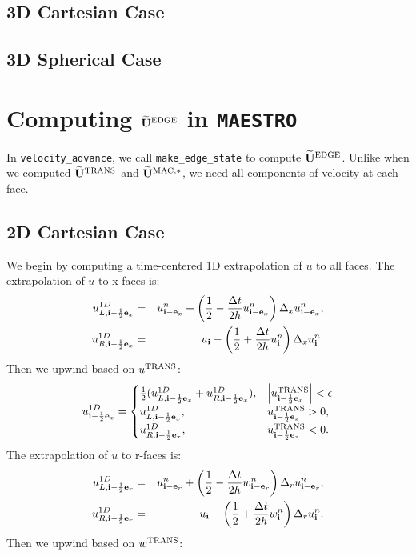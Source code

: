 \documentclass[11pt]{article}
\def\half  {\frac{1}{2}}
\def\dt    {\Delta t}
\def\edge  {\rm EDGE}
\def\mac   {\rm MAC}
\def\trans {\rm TRANS}
\def\eb    {{\bf e}}
\def\ib    {{\bf i}}
\def\Ubt   {\widetilde{\bf U}}
\begin{document}
\subsection{3D Cartesian Case}
\subsection{3D Spherical Case}
\cleardoublepage
\section{Computing $\Ubt^{\edge}$ in {\tt MAESTRO}}
In {\tt velocity\_advance}, we call {\tt make\_edge\_state} to compute $\Ubt^{\edge}$.  Unlike when we computed $\Ubt^{\trans}$ and $\Ubt^{\mac,*}$, we need all components of velocity at each face.
\subsection{2D Cartesian Case}
We begin by computing a time-centered 1D extrapolation of $u$ to all faces.  The extrapolation of $u$ to x-faces is:
\begin{eqnarray}
u_{L,\ib-\half\eb_x}^{1D} &=& u_{\ib-\eb_x}^n + \left(\half - \frac{\dt}{2h}u_{\ib-\eb_x}^n\right)\Delta_x u_{\ib-\eb_x}^n, \\
u_{R,\ib-\half\eb_x}^{1D} &=& u_{\ib} - \left(\half + \frac{\dt}{2h}u_{\ib}^n\right)\Delta_x u_{\ib}^n.
\end{eqnarray}
Then we upwind based on $u^{\trans}$:
\begin{equation}
u_{\ib-\half\eb_x}^{1D} =
\begin{cases}
\half(u_{L,\ib-\half\eb_x}^{1D} + u_{R,\ib-\half\eb_x}^{1D}), & \left|u^{\trans}_{\ib-\half\eb_x}\right| < \epsilon \\
u_{L,\ib-\half\eb_x}^{1D}, & u^{\trans}_{\ib-\half\eb_x} > 0, \\
u_{R,\ib-\half\eb_x}^{1D}, & u^{\trans}_{\ib-\half\eb_x} < 0. \\
\end{cases}
\end{equation}
The extrapolation of $u$ to r-faces is:
\begin{eqnarray}
u_{L,\ib-\half\eb_r}^{1D} &=& u_{\ib-\eb_r}^n + \left(\half - \frac{\dt}{2h}w_{\ib-\eb_r}^n\right)\Delta_r u_{\ib-\eb_r}^n, \\
u_{R,\ib-\half\eb_r}^{1D} &=& u_{\ib} - \left(\half + \frac{\dt}{2h}w_{\ib}^n\right)\Delta_r u_{\ib}^n.
\end{eqnarray}
Then we upwind based on $w^{\trans}$:
\end{document}
